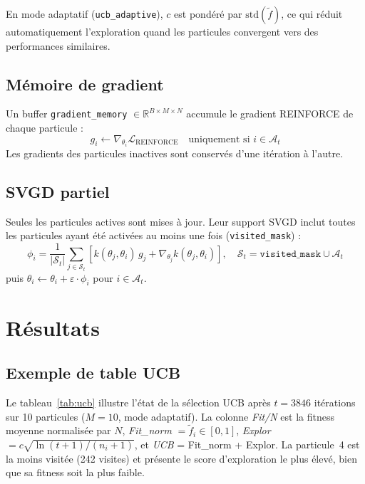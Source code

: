 \documentclass{article}
\begin{document}
En mode adaptatif (\texttt{ucb\_adaptive}), $c$ est pondéré par $\mathrm{std}(\tilde{f})$,
ce qui réduit automatiquement l'exploration quand les particules convergent vers des
performances similaires.

\subsection{Mémoire de gradient}

Un buffer \texttt{gradient\_memory} $\in \mathbb{R}^{B \times M \times N}$ accumule
le gradient REINFORCE de chaque particule :
\begin{equation}
  g_i \leftarrow \nabla_{\theta_i} \mathcal{L}_{\mathrm{REINFORCE}}
  \quad \text{uniquement si } i \in \mathcal{A}_t
\end{equation}
Les gradients des particules inactives sont conservés d'une itération à l'autre.

\subsection{SVGD partiel}

Seules les particules actives sont mises à jour. Leur support SVGD inclut toutes
les particules ayant été activées au moins une fois (\texttt{visited\_mask}) :
\begin{equation}
  \phi_i = \frac{1}{|\mathcal{S}_t|} \sum_{j \in \mathcal{S}_t}
  \left[ k(\theta_j, \theta_i)\, g_j + \nabla_{\theta_j} k(\theta_j, \theta_i) \right],
  \quad \mathcal{S}_t = \texttt{visited\_mask} \cup \mathcal{A}_t
\end{equation}
puis $\theta_i \leftarrow \theta_i + \varepsilon \cdot \phi_i$ pour $i \in \mathcal{A}_t$.

\section{Résultats}

\subsection{Exemple de table UCB}

Le tableau~\ref{tab:ucb} illustre l'état de la sélection UCB après $t=3846$ itérations
sur 10 particules ($M=10$, mode adaptatif). La colonne \emph{Fit/N} est la fitness
moyenne normalisée par $N$, \emph{Fit\_norm} $= \tilde{f}_i \in [0,1]$,
\emph{Explor} $= c \sqrt{\ln(t+1)/(n_i+1)}$, et \emph{UCB} = Fit\_norm + Explor.
La particule~4 est la moins visitée (242 visites) et présente le score d'exploration le
plus élevé, bien que sa fitness soit la plus faible.
\end{document}
